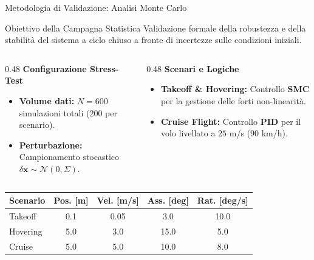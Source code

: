 \documentclass[aspectratio=169]{beamer} %
\begin{document}
\begin{frame}{Metodologia di Validazione: Analisi Monte Carlo}
    \begin{block}{Obiettivo della Campagna Statistica}
        Validazione formale della robustezza e della stabilità del sistema a ciclo chiuso a fronte di incertezze sulle condizioni iniziali.
    \end{block}

    \vspace{0.2cm}
    \begin{columns}[t]
        \begin{column}{0.48\textwidth}
            \textbf{\alert{Configurazione Stress-Test}}
            \begin{itemize}
                \item \textbf{Volume dati:} $N=600$ simulazioni totali ($200$ per scenario).
                \item \textbf{Perturbazione:} Campionamento stocastico $\delta \mathbf{x} \sim \mathcal{N}(0, \Sigma)$.
            \end{itemize}
        \end{column}

        \vrule{} %

        \begin{column}{0.48\textwidth}
            \textbf{\alert{Scenari e Logiche}}
            \begin{itemize}
                \item \textbf{Takeoff \& Hovering:} 
                Controllo \textbf{SMC} per la gestione delle forti non-linearità.
                \item \textbf{Cruise Flight:}
                Controllo \textbf{PID} per il volo livellato a $25$ m/s ($90$ km/h).
            \end{itemize}
        \end{column}
    \end{columns}

    \vspace{0.3cm}
    \begin{table}
        \centering
        \scriptsize
        \begin{tabular}{lcccc}
            \toprule
            \textbf{Scenario} & \textbf{Pos.} [m] & \textbf{Vel.} [m/s] & \textbf{Ass.} [deg] & \textbf{Rat.} [deg/s] \\
            \midrule
            Takeoff & 0.1 & 0.05 & 3.0 & 10.0 \\
            Hovering & 5.0 & 3.0 & 15.0 & 5.0 \\
            Cruise & 5.0 & 5.0 & 10.0 & 8.0 \\
            \bottomrule
        \end{tabular}
    \end{table}
\end{frame}
\end{document}
